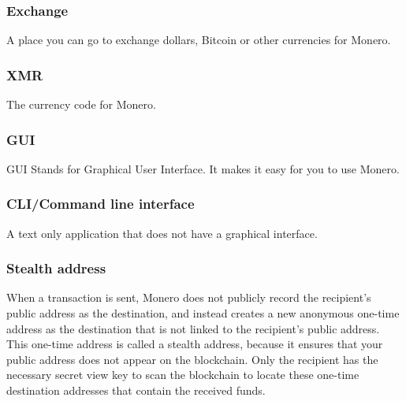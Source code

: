 \subsubsection{Exchange}
	A place you can go to exchange dollars, Bitcoin or other currencies for Monero.
\subsubsection{XMR}
The currency code for Monero.
\subsubsection{GUI}
	GUI Stands for Graphical User Interface. It makes it easy for you to use Monero.
\subsubsection{CLI/Command line interface}
	A text only application that does not have a graphical interface.
\subsubsection{Stealth address}
	When a transaction is sent, Monero does not publicly record the recipient's public address as the destination, and instead creates a new anonymous one-time address as the destination that is not linked to the recipient's public address. This one-time address is called a stealth address, because it ensures that your public address does not appear on the blockchain. Only the recipient has the necessary secret view key to scan the blockchain to locate these one-time destination addresses that contain the received funds.
